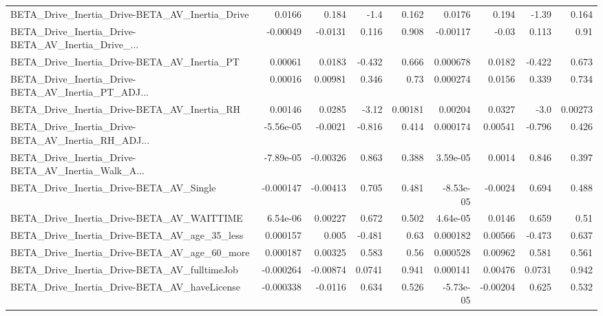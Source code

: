 \begin{tabular}{lrrrrrrrr}
BETA\_Drive\_Inertia\_Drive-BETA\_AV\_Inertia\_Drive     &      0.0166 &        0.184 &     -1.4 &    0.162 &     0.0176 &       0.194 &        -1.39 &         0.164 \\
BETA\_Drive\_Inertia\_Drive-BETA\_AV\_Inertia\_Drive\_... &    -0.00049 &      -0.0131 &    0.116 &    0.908 &   -0.00117 &       -0.03 &        0.113 &          0.91 \\
BETA\_Drive\_Inertia\_Drive-BETA\_AV\_Inertia\_PT        &     0.00061 &       0.0183 &   -0.432 &    0.666 &   0.000678 &      0.0182 &       -0.422 &         0.673 \\
BETA\_Drive\_Inertia\_Drive-BETA\_AV\_Inertia\_PT\_ADJ... &     0.00016 &      0.00981 &    0.346 &     0.73 &   0.000274 &      0.0156 &        0.339 &         0.734 \\
BETA\_Drive\_Inertia\_Drive-BETA\_AV\_Inertia\_RH        &     0.00146 &       0.0285 &    -3.12 &  0.00181 &    0.00204 &      0.0327 &         -3.0 &       0.00273 \\
BETA\_Drive\_Inertia\_Drive-BETA\_AV\_Inertia\_RH\_ADJ... &   -5.56e-05 &      -0.0021 &   -0.816 &    0.414 &   0.000174 &     0.00541 &       -0.796 &         0.426 \\
BETA\_Drive\_Inertia\_Drive-BETA\_AV\_Inertia\_Walk\_A... &   -7.89e-05 &     -0.00326 &    0.863 &    0.388 &   3.59e-05 &      0.0014 &        0.846 &         0.397 \\
BETA\_Drive\_Inertia\_Drive-BETA\_AV\_Single            &   -0.000147 &     -0.00413 &    0.705 &    0.481 &  -8.53e-05 &     -0.0024 &        0.694 &         0.488 \\
BETA\_Drive\_Inertia\_Drive-BETA\_AV\_WAITTIME          &    6.54e-06 &      0.00227 &    0.672 &    0.502 &   4.64e-05 &      0.0146 &        0.659 &          0.51 \\
BETA\_Drive\_Inertia\_Drive-BETA\_AV\_age\_35\_less       &    0.000157 &        0.005 &   -0.481 &     0.63 &   0.000182 &     0.00566 &       -0.473 &         0.637 \\
BETA\_Drive\_Inertia\_Drive-BETA\_AV\_age\_60\_more       &    0.000187 &      0.00325 &    0.583 &     0.56 &   0.000528 &     0.00962 &        0.581 &         0.561 \\
BETA\_Drive\_Inertia\_Drive-BETA\_AV\_fulltimeJob       &   -0.000264 &     -0.00874 &   0.0741 &    0.941 &   0.000141 &     0.00476 &       0.0731 &         0.942 \\
BETA\_Drive\_Inertia\_Drive-BETA\_AV\_haveLicense       &   -0.000338 &      -0.0116 &    0.634 &    0.526 &  -5.73e-05 &    -0.00204 &        0.625 &         0.532 \\

\end{tabular}
